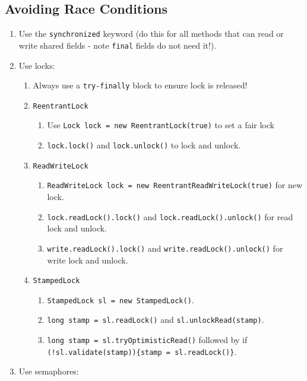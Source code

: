 \documentclass[twocolumn,english]{article}
\begin{document}
\subsection{Avoiding Race Conditions}
\begin{enumerate}
\item Use the \texttt{synchronized} keyword (do this for all methods that
can read or write shared fields - note \texttt{final} fields do not
need it!).
\item Use locks:

\begin{enumerate}
\item Always use a \texttt{try-finally} block to ensure lock is released!
\item \texttt{ReentrantLock}

\begin{enumerate}
\item Use \texttt{Lock lock = new ReentrantLock(true)} to set a fair lock
\item \texttt{lock.lock()} and \texttt{lock.unlock()} to lock and unlock.
\end{enumerate}
\item \texttt{ReadWriteLock}

\begin{enumerate}
\item \texttt{ReadWriteLock lock = new ReentrantReadWriteLock(true)} for
new lock.
\item \texttt{lock.readLock().lock()} and \texttt{lock.readLock().unlock()}
for read lock and unlock.
\item \texttt{write.readLock().lock()} and \texttt{write.readLock().unlock()}
for write lock and unlock.
\end{enumerate}
\item \texttt{StampedLock}

\begin{enumerate}
\item \texttt{StampedLock sl = new StampedLock()}.
\item \texttt{long stamp = sl.readLock()} and \texttt{sl.unlockRead(stamp)}.
\item \texttt{long stamp = sl.tryOptimisticRead()} followed by if \texttt{(!sl.validate(stamp))\{stamp
= sl.readLock()\}}.
\end{enumerate}
\end{enumerate}
\item Use semaphores:


\end{enumerate}
\end{document}
